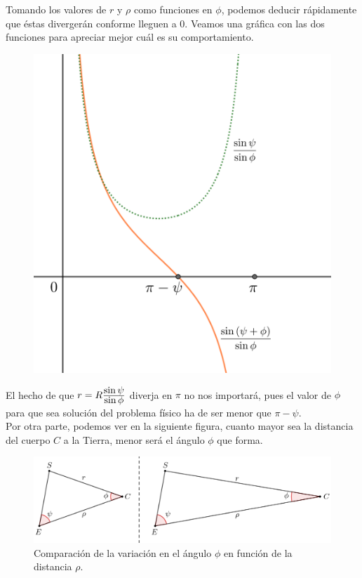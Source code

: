 Tomando los valores de $r$ y $\rho$ como funciones en $\phi$, podemos deducir rápidamente que éstas divergerán conforme lleguen a 0. Veamos una gráfica con las dos funciones para apreciar mejor cuál es su comportamiento.
\begin{figure}[H]
\centering
\includegraphics[scale=0.15]{images/motivo_error.png}
\end{figure}

El hecho de que $r=R\frac{\displaystyle \sin{\psi}}{\displaystyle \sin{\phi}}$ diverja en $\pi$ no nos importará, pues el valor de $\phi$ para que sea solución del problema físico ha de ser menor que $\pi-\psi$.\\

Por otra parte, podemos ver en la siguiente figura, cuanto mayor sea la distancia del cuerpo $C$ a la Tierra, menor será el ángulo $\phi$ que forma.
\begin{figure}[H]
\centering
\includegraphics[scale=0.125]{images/bigger_rho_smaller_phi.png}
\caption{Comparación de la variación en el ángulo $\phi$ en función de la distancia $\rho$.}
\label{fig:bigger_rho_smaller_phi.png}
\end{figure}

